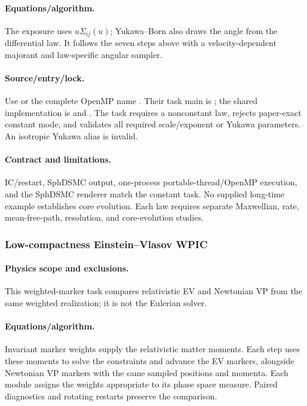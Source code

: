 \paragraph{Equations/algorithm.}
The exposure uses \(u\Sigma_{ij}(u)\); Yukawa--Born also draws the angle from
the differential law.  It follows the seven steps above with a
velocity-dependent majorant and law-specific angular sampler.
\paragraph{Source/entry/lock.}
Use  or the complete OpenMP
name .  Their task main
is ; the shared
implementation is  and
.  The task requires a
nonconstant law, rejects paper-exact constant mode, and validates all required
scale/exponent or Yukawa parameters.  An isotropic Yukawa alias is invalid.
\paragraph{Contract and limitations.}
IC/restart, SphDSMC output, one-process portable-thread/OpenMP execution, and
the SphDSMC renderer match the constant task.  No supplied long-time example
establishes core evolution.
Each law requires separate Maxwellian, rate, mean-free-path, resolution, and
core-evolution studies.

\subsubsection{Low-compactness Einstein--Vlasov WPIC}
\paragraph{Physics scope and exclusions.}
This weighted-marker task compares relativistic EV and Newtonian VP from the
same weighted realization; it is not the Eulerian solver.
\paragraph{Equations/algorithm.}
Invariant marker weights supply the relativistic matter moments. Each step
uses these moments to solve the constraints and advance the EV markers,
alongside Newtonian VP markers with the same sampled positions and momenta.
Each module assigns the weights appropriate to its phase space measure.
Paired diagnostics and rotating restarts preserve the comparison.
